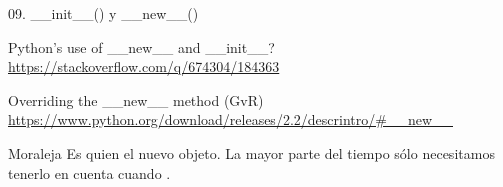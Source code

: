 \begin{frame}{09. \_\_init\_\_() y \_\_new\_\_()}
  \small
  \begin{block}
    {\centering Python's use of \_\_new\_\_ and \_\_init\_\_?}
    \centering
    \url{https://stackoverflow.com/q/674304/184363}
  \end{block}

  \begin{block}
    {\centering Overriding the \_\_new\_\_ method (GvR)}
    \centering
    \url{https://www.python.org/download/releases/2.2/descrintro/\#\_\_new\_\_}
  \end{block}

  \vspace{0.5cm}
  {
    \normalsize
    \begin{alertblock}{\centering Moraleja}
      \centering
      Es  quien  el nuevo
      objeto. La mayor parte del tiempo sólo necesitamos tenerlo en
      cuenta cuando .
    \end{alertblock}
  }
\end{frame}
